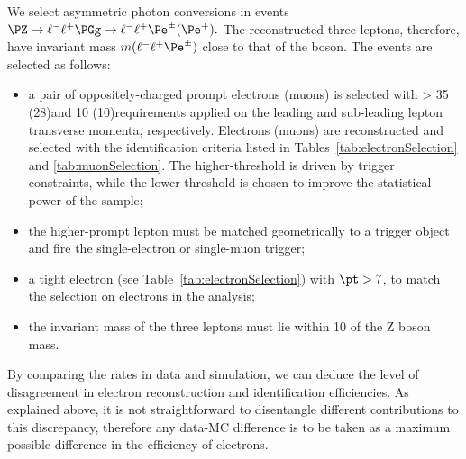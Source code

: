 
We select asymmetric photon conversions in events
\(\PZ\to\ell^-\ell^+\PGg\to\ell^-\ell^+\Pe^\pm(\Pe^\mp).\)
The reconstructed three leptons,
therefore, have invariant mass
\(m(\ell^-\ell^+\Pe^\pm)\)
close to that of the \PZ boson.
The events are selected as follows:
\begin{itemize}
\setlength\itemsep{-0.2em}
\item a pair of oppositely-charged prompt electrons (muons) is selected with \pt > 35 (28)\GeV and
10 (10)\GeV requirements applied on the leading and sub-leading lepton transverse momenta,
 respectively. Electrons (muons) are reconstructed and selected with
 the identification criteria listed in
 Tables~\ref{tab:electronSelection} and \ref{tab:muonSelection}.
  The higher-\pt threshold is driven by trigger constraints, while the
  lower-\pt threshold is chosen to improve the statistical power of
  the sample; 
\item the higher-\pt prompt lepton must be matched geometrically to a
  trigger object and fire the single-electron or single-muon trigger;
\item a \displ tight electron (see
  Table~\ref{tab:electronSelection}) with $\pt>7$\GeV, to match the
  selection on \displ electrons in the analysis;
\item the invariant mass of the three leptons must lie within 10\GeV
  of the Z boson mass.
\end{itemize}
By comparing the rates in data and simulation, we can deduce the level
of disagreement in \displ electron reconstruction and
identification efficiencies.
As explained above, it is not straightforward to disentangle different
contributions to this discrepancy, therefore any data-MC difference is
to be taken as a maximum possible difference in the efficiency of
\displ electrons.

